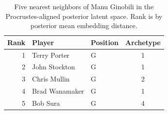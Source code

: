 \begin{table}[htbp]
  \centering\small
  \begin{tabular}{rllc}
    \toprule
    Rank & Player & Position & Archetype \\
    \midrule
    1 & Terry Porter & G & 1 \\
    2 & John Stockton & G & 1 \\
    3 & Chris Mullin & G & 2 \\
    4 & Brad Wanamaker & G & 1 \\
    5 & Bob Sura & G & 4 \\
    \bottomrule
  \end{tabular}
  \caption{Five nearest neighbors of Manu Ginobili in the Procrustes-aligned posterior latent space. Rank is by posterior mean embedding distance.}
  \label{tab:Manu_Ginobili_neighbors}
\end{table}

